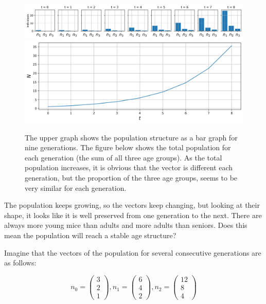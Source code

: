 \documentclass[12pt]{article}
\begin{document}
\begin{figure}
	\begin{center}
		\includegraphics[width=\textwidth]{pop_evol}
		\includegraphics[width=\textwidth]{tot_pop_evol}		
	\end{center}
	\caption{The upper graph shows the population structure as a bar graph for nine generations. The figure below shows the total population for each generation (the sum of all three age groups). As the total population increases, it is obvious that the vector is different each generation, but the proportion of the three age groups, seems to be very similar for each generation.}
	\label{fig:Lpop}
\end{figure}

The population keeps growing, so the vectors keep changing, but looking at their shape, it looks like it is well preserved from one generation to the next. There are always more young mice than adults and more adults than seniors. Does this mean the population will reach a stable age structure?

Imagine that the vectors of the population for several consecutive generations are as follows:

\begin{equation}
	n_0 = \begin{pmatrix} 3\\ 2 \\ 1\end{pmatrix}, 
	n_1 = \begin{pmatrix} 6\\ 4 \\ 2\end{pmatrix}, 
	n_2 = \begin{pmatrix} 12\\ 8 \\ 4\end{pmatrix}
\end{equation}
\end{document}
